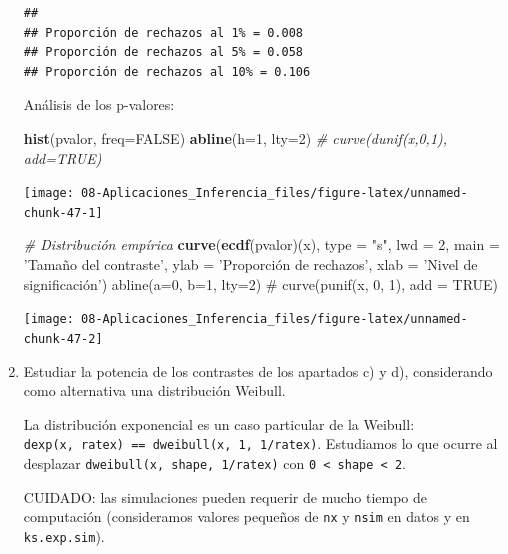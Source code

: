 \documentclass[]{book}
\newenvironment{Shaded}{\begin{snugshade}}{\end{snugshade}}
\newcommand{\KeywordTok}[1]{\textcolor[rgb]{0.13,0.29,0.53}{\textbf{#1}}}
\newcommand{\DataTypeTok}[1]{\textcolor[rgb]{0.13,0.29,0.53}{#1}}
\newcommand{\DecValTok}[1]{\textcolor[rgb]{0.00,0.00,0.81}{#1}}
\newcommand{\StringTok}[1]{\textcolor[rgb]{0.31,0.60,0.02}{#1}}
\newcommand{\CommentTok}[1]{\textcolor[rgb]{0.56,0.35,0.01}{\textit{#1}}}
\newcommand{\OtherTok}[1]{\textcolor[rgb]{0.56,0.35,0.01}{#1}}
\newcommand{\NormalTok}[1]{#1}
\theoremstyle{definition}
\theoremstyle{definition}
\theoremstyle{definition}
\theoremstyle{remark}
\begin{document}
\begin{enumerate}
\begin{verbatim}
## 
## Proporción de rechazos al 1% = 0.008 
## Proporción de rechazos al 5% = 0.058 
## Proporción de rechazos al 10% = 0.106
\end{verbatim}

  Análisis de los p-valores:

\begin{Shaded}
\begin{Highlighting}[]
\KeywordTok{hist}\NormalTok{(pvalor, }\DataTypeTok{freq=}\OtherTok{FALSE}\NormalTok{)}
\KeywordTok{abline}\NormalTok{(}\DataTypeTok{h=}\DecValTok{1}\NormalTok{, }\DataTypeTok{lty=}\DecValTok{2}\NormalTok{)   }\CommentTok{# curve(dunif(x,0,1), add=TRUE)}
\end{Highlighting}
\end{Shaded}

  \begin{center}\texttt{[image: 08-Aplicaciones\_Inferencia\_files/figure-latex/unnamed-chunk-47-1]} \end{center}

\begin{Shaded}
\begin{Highlighting}[]
\CommentTok{# Distribución empírica}
\KeywordTok{curve}\NormalTok{(}\KeywordTok{ecdf}\NormalTok{(pvalor)(x), }\DataTypeTok{type =} \StringTok{"s"}\NormalTok{, }\DataTypeTok{lwd =} \DecValTok{2}\NormalTok{, }
      \DataTypeTok{main =} \StringTok{'Tamaño del contraste'}\NormalTok{, }\DataTypeTok{ylab =} \StringTok{'Proporción de rechazos'}\NormalTok{, }
      \DataTypeTok{xlab =} \StringTok{'Nivel de significación')}
\StringTok{abline(a=0, b=1, lty=2)   # curve(punif(x, 0, 1), add = TRUE) }
\end{Highlighting}
\end{Shaded}

  \begin{center}\texttt{[image: 08-Aplicaciones\_Inferencia\_files/figure-latex/unnamed-chunk-47-2]} \end{center}
\item
  Estudiar la potencia de los contrastes de los apartados c) y d),
  considerando como alternativa una distribución Weibull.

  La distribución exponencial es un caso particular de la Weibull:
  \texttt{dexp(x,\ ratex)\ ==\ dweibull(x,\ 1,\ 1/ratex)}. Estudiamos lo
  que ocurre al desplazar \texttt{dweibull(x,\ shape,\ 1/ratex)} con
  \texttt{0\ \textless{}\ shape\ \textless{}\ 2}.

  CUIDADO: las simulaciones pueden requerir de mucho tiempo de
  computación (consideramos valores pequeños de \texttt{nx} y
  \texttt{nsim} en datos y en \texttt{ks.exp.sim}).


\end{enumerate}
\end{document}
